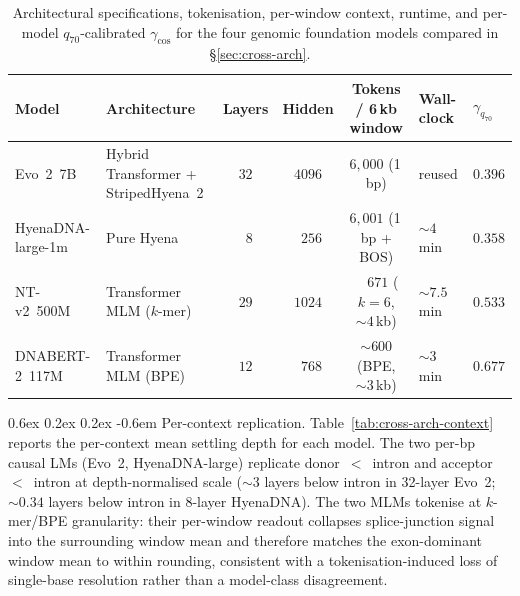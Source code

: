 \documentclass{article}
\makeatletter
\renewcommand\paragraph{\@startsection{paragraph}{4}{\z@}%
  {0.6ex \@plus 0.2ex \@minus 0.2ex}%
  {-0.6em}%
{\normalfont\normalsize\bfseries}}
\theoremstyle{plain}
\theoremstyle{definition}
\theoremstyle{remark}
\makeatother
\begin{document}
\begin{table}[!htbp]
  \caption{Architectural specifications, tokenisation, per-window context,
    runtime, and per-model $q_{70}$-calibrated $\gamma_{\cos}$ for the four
  genomic foundation models compared in \S\ref{sec:cross-arch}.}
  \label{tab:fm-specs}
  \centering
  \footnotesize
  \setlength{\tabcolsep}{4pt}
  \begin{tabular}{@{}llcccll@{}}
    \toprule
    Model & Architecture & Layers & Hidden & Tokens / 6\,kb window
    & Wall-clock & $\gamma_{q_{70}}$ \\
    \midrule
    Evo~2~7B          & Hybrid Transformer + StripedHyena~2 & $32$ & $4096$
    & $6{,}000$ (1\,bp)         & reused      & $0.396$ \\
    HyenaDNA-large-1m & Pure Hyena                          & $\phantom{0}8$ & $\phantom{0}256$
    & $6{,}001$ (1\,bp + BOS)   & $\sim 4$\,min    & $0.358$ \\
    NT-v2~500M        & Transformer MLM ($k$-mer)           & $29$ & $1024$
    & $\phantom{0,}671$ ($k=6$, $\sim 4$\,kb) & $\sim 7.5$\,min  & $0.533$ \\
    DNABERT-2~117M    & Transformer MLM (BPE)               & $12$ & $\phantom{0}768$
    & $\sim 600$ (BPE, $\sim 3$\,kb)        & $\sim 3$\,min    & $0.677$ \\
    \bottomrule
  \end{tabular}
\end{table}

\paragraph{Per-context replication.} Table~\ref{tab:cross-arch-context}
reports the per-context mean settling depth for each model. The two
per-bp causal LMs (Evo~2, HyenaDNA-large) replicate
donor~$<$~intron and acceptor~$<$~intron at depth-normalised scale
($\sim 3$ layers below intron in 32-layer Evo~2; $\sim 0.34$ layers below
intron in 8-layer HyenaDNA). The two MLMs tokenise at $k$-mer/BPE
granularity: their per-window readout collapses splice-junction signal
into the surrounding window mean and therefore matches the exon-dominant
window mean to within rounding, consistent with a tokenisation-induced
loss of single-base resolution rather than a model-class disagreement.
\end{document}
